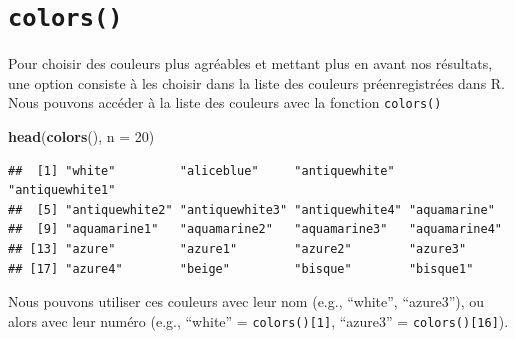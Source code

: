 \documentclass[
]{book}
\newenvironment{Shaded}{\begin{snugshade}}{\end{snugshade}}
\newcommand{\DataTypeTok}[1]{\textcolor[rgb]{0.13,0.29,0.53}{#1}}
\newcommand{\DecValTok}[1]{\textcolor[rgb]{0.00,0.00,0.81}{#1}}
\newcommand{\KeywordTok}[1]{\textcolor[rgb]{0.13,0.29,0.53}{\textbf{#1}}}
\newcommand{\NormalTok}[1]{#1}
\begin{document}
\hypertarget{colors}{%
\section{\texorpdfstring{\texttt{colors()}}{colors()}}\label{colors}}

Pour choisir des couleurs plus agréables et mettant plus en avant nos résultats, une option consiste à les choisir dans la liste des couleurs préenregistrées dans R. Nous pouvons accéder à la liste des couleurs avec la fonction \texttt{colors()}

\begin{Shaded}
\begin{Highlighting}[]
\KeywordTok{head}\NormalTok{(}\KeywordTok{colors}\NormalTok{(), }\DataTypeTok{n =} \DecValTok{20}\NormalTok{)}
\end{Highlighting}
\end{Shaded}

\begin{verbatim}
##  [1] "white"         "aliceblue"     "antiquewhite"  "antiquewhite1"
##  [5] "antiquewhite2" "antiquewhite3" "antiquewhite4" "aquamarine"   
##  [9] "aquamarine1"   "aquamarine2"   "aquamarine3"   "aquamarine4"  
## [13] "azure"         "azure1"        "azure2"        "azure3"       
## [17] "azure4"        "beige"         "bisque"        "bisque1"
\end{verbatim}

Nous pouvons utiliser ces couleurs avec leur nom (e.g., ``white'', ``azure3''), ou alors avec leur numéro (e.g., ``white'' = \texttt{colors(){[}1{]}}, ``azure3'' = \texttt{colors(){[}16{]}}).
\end{document}
